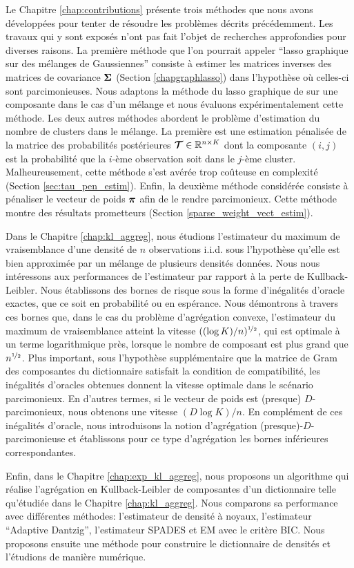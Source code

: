 Le Chapitre \ref{chap:contributions} présente trois méthodes que nous avons développées pour tenter de résoudre les problèmes décrits précédemment. Les travaux qui y sont exposés n'ont pas fait l'objet de recherches approfondies pour diverses raisons. La première méthode que l'on pourrait appeler ``lasso graphique sur des mélanges de Gaussiennes'' consiste à estimer les matrices inverses des matrices de covariance $\boldsymbol\Sigma$ (Section \ref{chapgraphlasso}) dans l'hypothèse où celles-ci sont parcimonieuses. Nous adaptons la méthode du lasso graphique de \citep{glasso07} sur une composante dans le cas d'un mélange et nous évaluons expérimentalement cette méthode. Les deux autres méthodes abordent le problème d'estimation du nombre de clusters dans le mélange. La première est une estimation pénalisée de la matrice des probabilités postérieures $\boldsymbol{\mathcal T}\in{\mathbb R}^{n\times K}$ dont la composante $(i,j)$ est la probabilité que la $i$-ème observation soit dans le $j$-ème cluster. Malheureusement, cette méthode s'est avérée trop coûteuse en complexité (Section \ref{sec:tau_pen_estim}). Enfin, la deuxième méthode considérée consiste à pénaliser le vecteur de poids $\boldsymbol \pi$ afin de le rendre parcimonieux. Cette méthode montre des résultats prometteurs (Section \ref{sparse_weight_vect_estim}).

Dans le Chapitre \ref{chap:kl_aggreg}, nous étudions l'estimateur du maximum de vraisemblance d'une densité de $n$ observations i.i.d. sous l’hypothèse qu'elle est bien approximée par un mélange de plusieurs densités données. Nous nous intéressons aux performances de l'estimateur par rapport à la perte de Kullback-Leibler. Nous établissons des bornes de risque sous la forme d'inégalités d'oracle exactes, que ce soit en probabilité ou en espérance. Nous démontrons à travers ces bornes que, dans le cas du problème d’agrégation convexe, l'estimateur du maximum de vraisemblance atteint la vitesse $((\log K)/n)^{\nicefrac12}$, qui est optimale à un terme logarithmique près, lorsque le nombre de composant est plus grand que $n^{\nicefrac12}$. Plus important, sous l’hypothèse supplémentaire que la matrice de Gram des composantes du dictionnaire satisfait la condition de compatibilité, les inégalités d'oracles obtenues donnent la vitesse optimale dans le scénario parcimonieux. En d'autres termes, si le vecteur de poids est (presque) $D$-parcimonieux, nous obtenons une vitesse $(D\log K)/n$. En complément de ces inégalités d'oracle, nous introduisons la notion d’agrégation (presque)-$D$-parcimonieuse et établissons pour ce type d’agrégation les bornes inférieures correspondantes.

Enfin, dans le Chapitre \ref{chap:exp_kl_aggreg}, nous proposons un algorithme qui réalise l'agrégation en Kullback-Leibler de composantes d'un dictionnaire telle qu'étudiée dans le Chapitre \ref{chap:kl_aggreg}. Nous comparons sa performance avec différentes méthodes: l'estimateur de densité à noyaux, l'estimateur ``Adaptive Dantzig'', l'estimateur SPADES et EM avec le critère BIC. Nous proposons ensuite une méthode pour construire le dictionnaire de densités et l’étudions de manière numérique.
